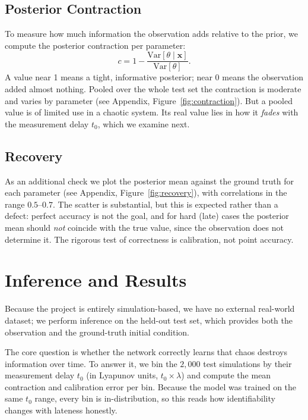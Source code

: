 \documentclass[12pt]{article}
\begin{document}
\subsection{Posterior Contraction}
To measure how much information the observation adds relative to the prior, we compute the posterior
contraction per parameter:
\begin{equation}
    c = 1 - \frac{\mathrm{Var}[\theta \mid \mathbf{x}]}{\mathrm{Var}[\theta]}.
\end{equation}
A value near 1 means a tight, informative posterior; near 0 means the observation added almost
nothing. Pooled over the whole test set the contraction is moderate and varies by parameter
(see Appendix, Figure~\ref{fig:contraction}). But a pooled value is of limited use in a chaotic system. Its real
value lies in how it \emph{fades} with the measurement delay $t_0$, which we examine next.
 
\subsection{Recovery}
As an additional check we plot the posterior mean against the ground truth for each parameter
(see Appendix, Figure~\ref{fig:recovery}), with correlations in the range $0.5$--$0.7$. The scatter is substantial,
but this is expected rather than a defect: perfect accuracy is not the goal, and for hard (late) cases
the posterior mean should \emph{not} coincide with the true value, since the observation does not
determine it. The rigorous test of correctness is calibration, not point accuracy.

\section{Inference and Results}
\label{sec:results}
Because the project is entirely simulation-based, we have no external real-world dataset; we perform
inference on the held-out test set, which provides both the observation and the ground-truth initial
condition.
 
The core question is whether the network correctly learns that chaos destroys information over time.
To answer it, we bin the $2{,}000$ test simulations by their measurement delay $t_0$ (in Lyapunov
units, $t_0 \times \lambda$) and compute the mean contraction and calibration error per bin. Because
the model was trained on the same $t_0$ range, every bin is in-distribution, so this reads how
identifiability changes with lateness honestly.
 
\end{document}
